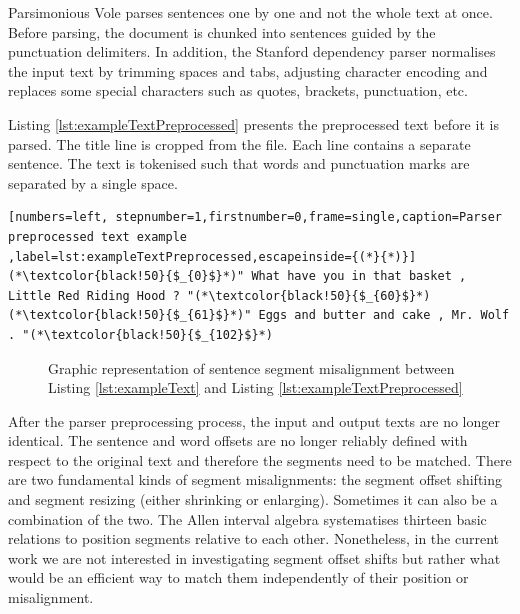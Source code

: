     Parsimonious Vole parses sentences one by one and not the whole text at once. Before parsing, the document is chunked into sentences guided by the punctuation delimiters. In addition, the Stanford dependency parser normalises the input text by trimming spaces and tabs, adjusting character encoding and replaces some special characters such as quotes, brackets, punctuation, etc.

    Listing \ref{lst:exampleTextPreprocessed} presents the preprocessed text before it is parsed. The title line is cropped from the file. Each line contains a separate sentence. The text is tokenised such that words and punctuation marks are separated by a single space.

\begin{lstlisting}[numbers=left, stepnumber=1,firstnumber=0,frame=single,caption=Parser preprocessed text example ,label=lst:exampleTextPreprocessed,escapeinside={(*}{*)}]
(*\textcolor{black!50}{$_{0}$}*)" What have you in that basket , Little Red Riding Hood ? "(*\textcolor{black!50}{$_{60}$}*)
(*\textcolor{black!50}{$_{61}$}*)" Eggs and butter and cake , Mr. Wolf . "(*\textcolor{black!50}{$_{102}$}*)
\end{lstlisting}

    \begin{figure}[!ht]
        \centering
        \caption{Graphic representation of sentence segment misalignment between Listing \ref{lst:exampleText} and Listing \ref{lst:exampleTextPreprocessed} }
        \label{fig:segment-misalignment}
    \end{figure}

    After the parser preprocessing process, the input and output texts are no longer identical. The sentence and word offsets are no longer reliably defined with respect to the original text and therefore the segments need to be matched. There are two fundamental kinds of segment misalignments: the segment offset shifting and segment resizing (either shrinking or enlarging). Sometimes it can also be a combination of the two. The Allen interval algebra \citep{Allen1983} systematises thirteen basic relations to position segments relative to each other. Nonetheless, in the current work we are not interested in investigating segment offset shifts but rather what would be an efficient way to match them independently of their position or misalignment.

